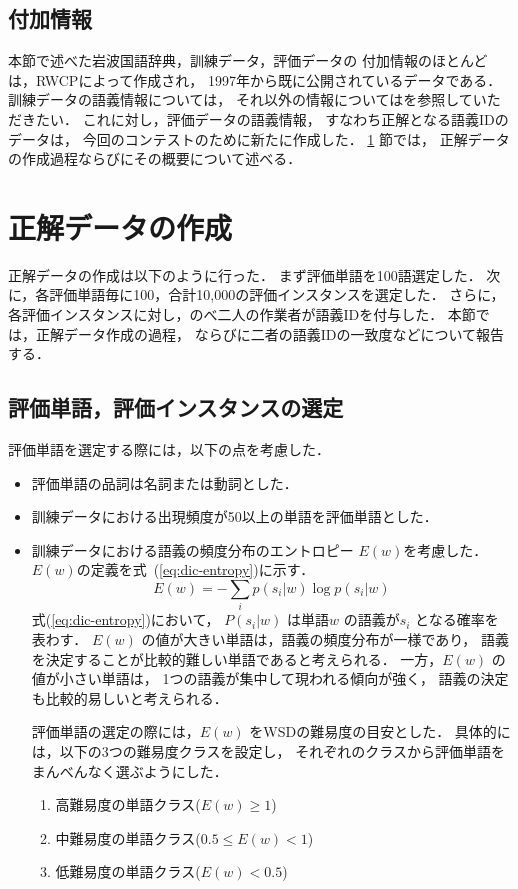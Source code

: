 \subsection{付加情報}

本節で述べた岩波国語辞典，訓練データ，評価データの
付加情報のほとんどは，RWCPによって作成され，
1997年から既に公開されているデータである．
訓練データの語義情報については\cite{sirai:01:b}，
それ以外の情報については\cite{hasida:98:a}を参照していただきたい．
これに対し，評価データの語義情報，
すなわち正解となる語義IDのデータは，
今回のコンテストのために新たに作成した．
\ref{sec:gold standard} 節では，
正解データの作成過程ならびにその概要について述べる．

\section{正解データの作成}
\label{sec:gold standard}

正解データの作成は以下のように行った．
まず評価単語を100語選定した．
次に，各評価単語毎に100，合計10,000の評価インスタンスを選定した．
さらに，各評価インスタンスに対し，のべ二人の作業者が語義IDを付与した．
本節では，正解データ作成の過程，
ならびに二者の語義IDの一致度などについて報告する．

\subsection{評価単語，評価インスタンスの選定}
\label{sec:dic-target-word-selection}

評価単語を選定する際には，以下の点を考慮した．
\begin{itemize}
\item
  評価単語の品詞は名詞または動詞とした．
\item 
  訓練データにおける出現頻度が50以上の単語を評価単語とした．
\item 
  訓練データにおける語義の頻度分布のエントロピー
  $E(w)$を考慮した．
  $E(w)$の定義を式~(\ref{eq:dic-entropy})に示す．
  \begin{equation}
    \label{eq:dic-entropy}
    E(w) = - \sum_i p(s_i|w) \log p(s_i|w)
  \end{equation}
  式(\ref{eq:dic-entropy})において，
  $P(s_i|w)$ は単語$w$ の語義が$s_i$ となる確率を表わす．
  $E(w)$ の値が大きい単語は，語義の頻度分布が一様であり，
  語義を決定することが比較的難しい単語であると考えられる．
  一方，$E(w)$ の値が小さい単語は，
  1つの語義が集中して現われる傾向が強く，
  語義の決定も比較的易しいと考えられる．

  評価単語の選定の際には，$E(w)$ をWSDの難易度の目安とした．
  具体的には，以下の3つの難易度クラスを設定し，
  それぞれのクラスから評価単語をまんべんなく選ぶようにした．
  \begin{enumerate}
  \item 高難易度の単語クラス\clA ($E(w) \ge 1$)
  \item 中難易度の単語クラス\clB ($0.5 \le E(w) < 1$)
  \item 低難易度の単語クラス\clC ($E(w) < 0.5$)
  \end{enumerate}
\end{itemize}

